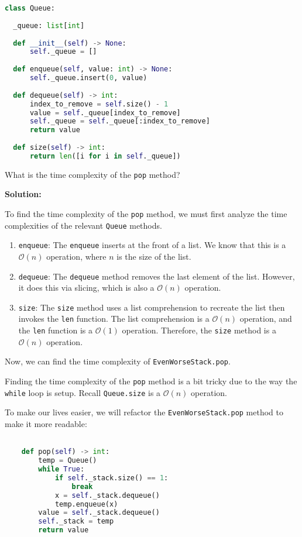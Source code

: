 \documentclass{article}
\begin{document}
\begin{lstlisting}[language=Python, style=mystyle]
class Queue:
  
  _queue: list[int]
  
  def __init__(self) -> None:
      self._queue = []
  
  def enqueue(self, value: int) -> None:
      self._queue.insert(0, value)
  
  def dequeue(self) -> int:
      index_to_remove = self.size() - 1
      value = self._queue[index_to_remove]
      self._queue = self._queue[:index_to_remove]
      return value
  
  def size(self) -> int:
      return len([i for i in self._queue])
    \end{lstlisting}
  
What is the time complexity of the \texttt{pop} method?

\textbf{Solution:}

To find the time complexity of the \texttt{pop} method, we must first analyze the time complexities of the relevant \texttt{Queue} methods.

\begin{enumerate}
    \item \texttt{enqueue}: The \texttt{enqueue} inserts at the front of a list. We know that this is a $\mathcal{O}(n)$ operation, where $n$ is the size of the list.
    \item \texttt{dequeue}: The \texttt{dequeue} method removes the last element of the list. However, it does this via slicing, which is also a $\mathcal{O}(n)$ operation.
    \item \texttt{size}: The \texttt{size} method uses a list comprehension to recreate the list then invokes the \texttt{len} function. The list comprehension is a $\mathcal{O}(n)$ operation, and the \texttt{len} function is a $\mathcal{O}(1)$ operation. Therefore, the \texttt{size} method is a $\mathcal{O}(n)$ operation.
\end{enumerate}

Now, we can find the time complexity of \texttt{EvenWorseStack.pop}. 

Finding the time complexity of the \texttt{pop} method is a bit tricky due to the way the \texttt{while} loop is setup. Recall \texttt{Queue.size} is a $\mathcal{O}(n)$ operation. 

To make our lives easier, we will refactor the \texttt{EvenWorseStack.pop} method to make it more readable:

\begin{lstlisting}[language=Python, style=mystyle]

    def pop(self) -> int:
        temp = Queue()
        while True:
            if self._stack.size() == 1:
                break
            x = self._stack.dequeue()
            temp.enqueue(x)
        value = self._stack.dequeue()
        self._stack = temp
        return value
\end{lstlisting}
\end{document}
